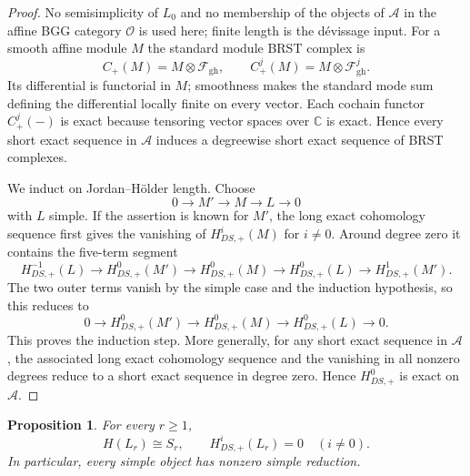 \documentclass[12pt,leqno]{amsart}
\numberwithin{equation}{section}
\newtheorem{prop}[thm]{Proposition}
\def\C{\mathbb{C}}
\begin{document}
\begin{proof}
No semisimplicity of $L_0$ and no membership of the objects of
$\mathscr A$ in the affine BGG category $\mathcal O$ is used here;
finite length is the d\'evissage input.  For a smooth affine module $M$
the standard module BRST complex is
\[
 C_+(M)=M\otimes\mathcal F_{\mathrm{gh}},
 \qquad
 C_+^j(M)=M\otimes\mathcal F_{\mathrm{gh}}^j.
\]
Its differential is functorial in $M$; smoothness makes the standard
mode sum defining the differential locally finite on every vector.  Each
cochain functor $C_+^j(-)$ is exact because tensoring vector spaces over
$\C$ is exact.  Hence every
short exact sequence in $\mathscr A$ induces a degreewise short exact
sequence of BRST complexes.

We induct on Jordan--H\"older length.  Choose
\[
 0\longrightarrow M'\longrightarrow M\longrightarrow L\longrightarrow0
\]
with $L$ simple.  If the assertion is known for $M'$, the long exact cohomology sequence
first gives the vanishing of $H^i_{DS,+}(M)$ for $i\ne0$.  Around degree
zero it contains the five-term segment
\[
 H^{-1}_{DS,+}(L)\longrightarrow H^0_{DS,+}(M')
 \longrightarrow H^0_{DS,+}(M)\longrightarrow H^0_{DS,+}(L)
 \longrightarrow H^1_{DS,+}(M').
\]
The two outer terms vanish by the simple case and the induction hypothesis,
so this reduces to
\[
 0\longrightarrow H^0_{DS,+}(M')\longrightarrow H^0_{DS,+}(M)
 \longrightarrow H^0_{DS,+}(L)\longrightarrow0.
\]
This proves the induction step.  More generally, for any
short exact sequence in $\mathscr A$, the associated long exact
cohomology sequence and the vanishing in all nonzero degrees reduce to a
short exact sequence in degree zero.  Hence $H^0_{DS,+}$ is exact on
$\mathscr A$.
\end{proof}

\begin{prop}\label{prop:H-simple}
For every $r\geq1$,
\[
 H(L_r)\cong S_r,
 \qquad
 H^i_{DS,+}(L_r)=0\quad(i\neq0).
\]
In particular, every simple object has nonzero simple reduction.
\end{prop}
\end{document}
